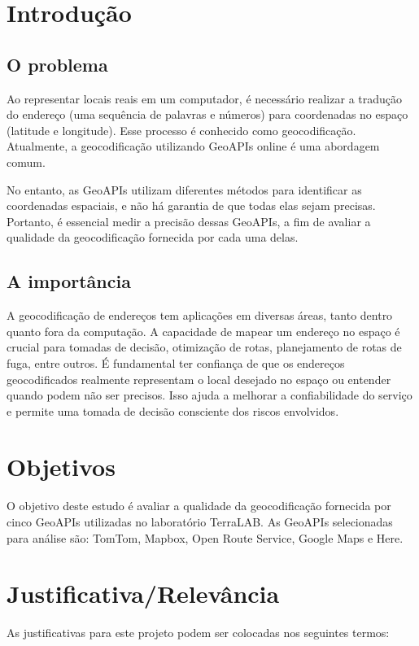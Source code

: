 \documentclass{article}
\begin{document}
\section{Introdução}

\subsection{O problema}
Ao representar locais reais em um computador, é necessário realizar a tradução do endereço (uma sequência de palavras e números) para coordenadas no espaço (latitude e longitude). Esse processo é conhecido como geocodificação. Atualmente, a geocodificação utilizando GeoAPIs online é uma abordagem comum.

No entanto, as GeoAPIs utilizam diferentes métodos para identificar as coordenadas espaciais, e não há garantia de que todas elas sejam precisas. Portanto, é essencial medir a precisão dessas GeoAPIs, a fim de avaliar a qualidade da geocodificação fornecida por cada uma delas.

\subsection{A importância}
A geocodificação de endereços tem aplicações em diversas áreas, tanto dentro quanto fora da computação. A capacidade de mapear um endereço no espaço é crucial para tomadas de decisão, otimização de rotas, planejamento de rotas de fuga, entre outros. É fundamental ter confiança de que os endereços geocodificados realmente representam o local desejado no espaço ou entender quando podem não ser precisos. Isso ajuda a melhorar a confiabilidade do serviço e permite uma tomada de decisão consciente dos riscos envolvidos.

\section{Objetivos}

O objetivo deste estudo é avaliar a qualidade da geocodificação fornecida por cinco GeoAPIs utilizadas no laboratório TerraLAB. As GeoAPIs selecionadas para análise são: TomTom, Mapbox, Open Route Service, Google Maps e Here.
   
\section{Justificativa/Relevância}

As justificativas para este projeto podem ser colocadas nos seguintes termos:
\end{document}
